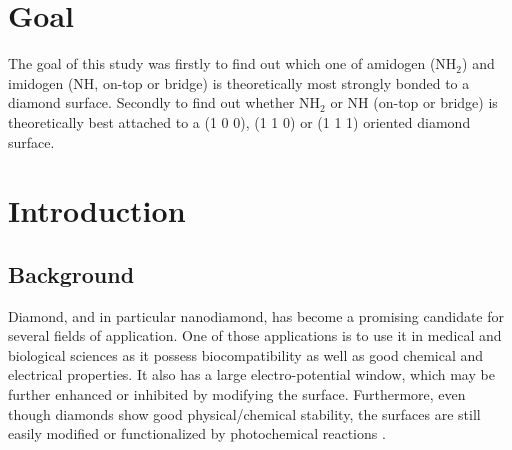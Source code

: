\documentclass[10pt,a4paper]{article}
\begin{document}
\newpage
\tableofcontents
\newpage

\section{Goal}
The goal of this study was firstly to find out which one of amidogen (NH$_2$) and imidogen (NH, on-top or bridge) is theoretically most strongly bonded to a diamond surface. Secondly to find out whether NH$_2$ or NH (on-top or bridge) is theoretically best attached to a (1 0 0), (1 1 0) or (1 1 1) oriented diamond surface.

\section{Introduction}
\subsection{Background}
Diamond, and in particular nanodiamond, has become a promising candidate for several fields of application. One of those applications is to use it in medical and biological sciences as it possess biocompatibility  as well as good chemical and electrical properties. It also has a large electro-potential window, which may be further enhanced or inhibited by modifying the surface. Furthermore, even though diamonds show good physical/chemical stability, the surfaces are still easily modified or functionalized by photochemical reactions \cite{c.e.nebel2007}.
\end{document}
